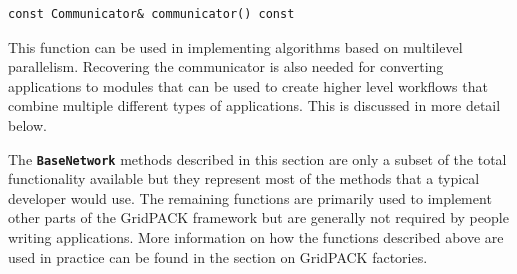 {
\color{red}
\begin{Verbatim}[fontseries=b]
const Communicator& communicator() const
\end{Verbatim}
}

This function can be used in implementing algorithms based on multilevel parallelism. Recovering the communicator is also needed for converting applications to modules that can be used to create higher level workflows that combine multiple different types of applications. This is discussed in more detail below.

The \texttt{\textbf{BaseNetwork}} methods described in this section are only a subset of the total functionality available but they represent most of the methods that a typical developer would use. The remaining functions are primarily used to implement other parts of the GridPACK framework but are generally not required by people writing applications. More information on how the functions described above are used in practice can be found in the section on GridPACK factories.
